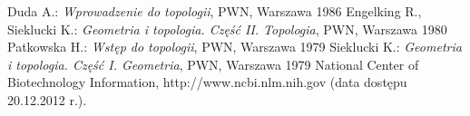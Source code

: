\begin{thebibliography}{3}                      %
\small              %
Duda A.: \emph{Wprowadzenie do topologii}, PWN, Warszawa 1986
Engelking R., Sieklucki K.: \emph{Geometria i topologia. Część II. Topologia}, PWN, Warszawa 1980
Patkowska H.: \emph{Wstęp do topologii}, PWN, Warszawa 1979
Sieklucki K.: \emph{Geometria i topologia. Część I. Geometria}, PWN, Warszawa 1979
National Center of Biotechnology Information, http://www.ncbi.nlm.nih.gov (data dostępu 20.12.2012 r.).
  
\end{thebibliography}                           %